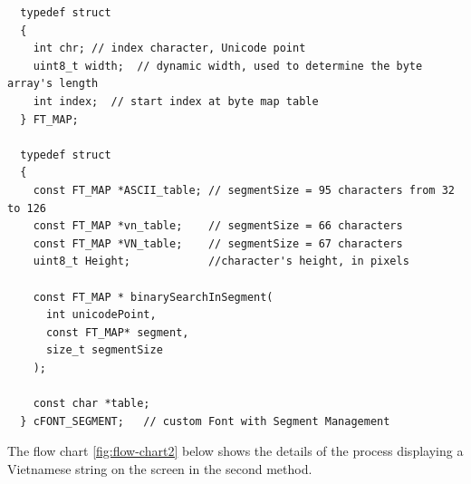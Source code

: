 \documentclass[../Main.tex]{subfiles}
\begin{document}
{\fontsize{8pt}{8pt}\selectfont 
    \begin{verbatim}
  typedef struct 
  {
    int chr; // index character, Unicode point
    uint8_t width;  // dynamic width, used to determine the byte array's length
    int index;  // start index at byte map table
  } FT_MAP;

  typedef struct
  {    
    const FT_MAP *ASCII_table; // segmentSize = 95 characters from 32 to 126
    const FT_MAP *vn_table;    // segmentSize = 66 characters
    const FT_MAP *VN_table;    // segmentSize = 67 characters
    uint8_t Height;            //character's height, in pixels
  
    const FT_MAP * binarySearchInSegment(
      int unicodePoint, 
      const FT_MAP* segment, 
      size_t segmentSize
    );
    
    const char *table;
  } cFONT_SEGMENT;   // custom Font with Segment Management
    \end{verbatim}
}

 The flow chart \ref{fig:flow-chart2} below shows the details of the process displaying a Vietnamese string on the screen in the second method.
\end{document}
